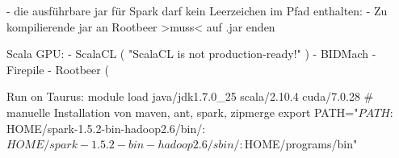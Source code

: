 \begin{frame}
  - die ausführbare jar für Spark darf kein Leerzeichen im Pfad enthalten:
  - Zu kompilierende jar an Rootbeer >muss< auf .jar enden
\end{frame}

\begin{frame}
Scala GPU:
  - ScalaCL ( "ScalaCL is not production-ready!" )
  - BIDMach
  - Firepile
  - Rootbeer (
\end{frame}

\begin{frame}
Run on Taurus:
    module load java/jdk1.7.0_25 scala/2.10.4 cuda/7.0.28
    # manuelle Installation von maven, ant, spark, zipmerge
    export PATH="$PATH:$HOME/spark-1.5.2-bin-hadoop2.6/bin/:$HOME/spark-1.5.2-bin-hadoop2.6/sbin/:$HOME/programs/bin"
\end{frame}


